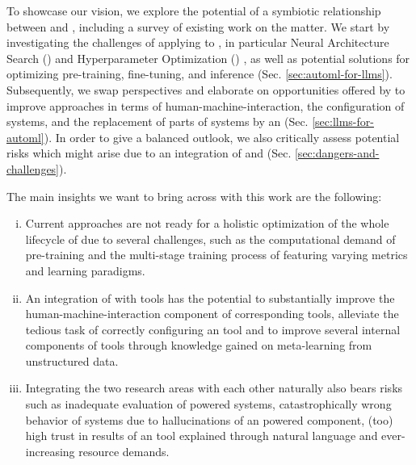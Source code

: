 \documentclass[10pt]{article} %
\begin{document}
To showcase our vision, we explore the potential of a symbiotic relationship between \AutoML and \LLMs, including a survey of existing work on the matter. We start by investigating the challenges of applying \AutoML to \LLMs, in particular Neural Architecture Search (\NAS) \citep{elsken-jmlr19a,wistuba-arxiv19a,white-arxiv23a} and Hyperparameter Optimization (\HPO) \citep{feurer-automlbook19a,bischl-dmkd23a}, as well as potential solutions for optimizing pre-training, fine-tuning, and inference (Sec. \ref{sec:automl-for-llms}). Subsequently, we swap perspectives and elaborate on opportunities offered by \LLMs to improve \AutoML approaches in terms of human-machine-interaction, the configuration of \AutoML systems, and the replacement of parts of \AutoML systems by an \LLM (Sec. \ref{sec:llms-for-automl}). In order to give a balanced outlook, we also critically assess potential risks which might arise due to an integration of \AutoML and \LLMs (Sec. \ref{sec:dangers-and-challenges}). 

The main insights we want to bring across with this work are the following: 
\begin{enumerate}[(i)]
    \item Current \AutoML approaches are not ready for a holistic optimization of the whole lifecycle of \LLMs due to several challenges, such as the computational demand of pre-training and the multi-stage training process of \LLMs featuring varying metrics and learning paradigms. 
    \item An integration of \LLMs with \AutoML tools has the potential to substantially improve the human-machine-interaction component of corresponding tools, alleviate the tedious task of correctly configuring an \AutoML tool and to improve several internal components of \AutoML tools through knowledge gained on meta-learning from unstructured data.
    \item Integrating the two research areas with each other naturally also bears risks such as inadequate evaluation of \LLM powered \AutoML systems, catastrophically wrong behavior of \AutoML systems due to hallucinations of an \LLM powered component, (too) high trust in results of an \AutoML tool explained through natural language and ever-increasing resource demands.
\end{enumerate}

\end{document}
